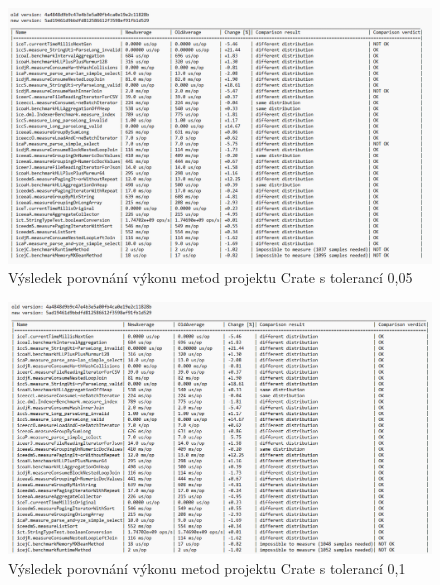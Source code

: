 \begin{figure}
    \centering
    \includegraphics[width=1.5\textwidth, angle=270]{../img/example-table.png}
    \caption{Výsledek porovnání výkonu metod projektu Crate s tolerancí 0,05}
\end{figure}

\begin{figure}
    \centering
    \includegraphics[width=1.5\textwidth, angle=270]{../img/example-table-higher-tolerance.png}
    \caption{Výsledek porovnání výkonu metod projektu Crate s tolerancí 0,1}
\end{figure}